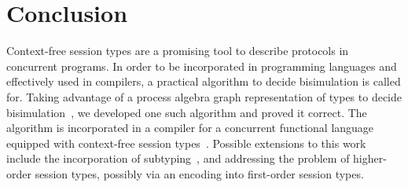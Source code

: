 \section{Conclusion}
\label{sec:conclusion}

Context-free session types are a promising tool to describe protocols
in concurrent programs. In order to be incorporated in programming
languages and effectively used in compilers, a practical algorithm to
decide bisimulation is called for.
%
Taking advantage of a process algebra graph representation of types to
decide
bisimulation~\cite{DBLP:journals/tcs/HirshfeldJM96,DBLP:conf/concur/HirshfeldM94},
we developed one such algorithm and proved it correct. The algorithm
is incorporated in a compiler for a concurrent functional language
equipped with context-free session
types~\cite{almeida.etal_freest-functional-language}.
%
Possible extensions to this work include the incorporation of
subtyping~\cite{DBLP:journals/acta/GayH05}, and addressing the problem
of higher-order session types, possibly via an encoding into
first-order session types.


